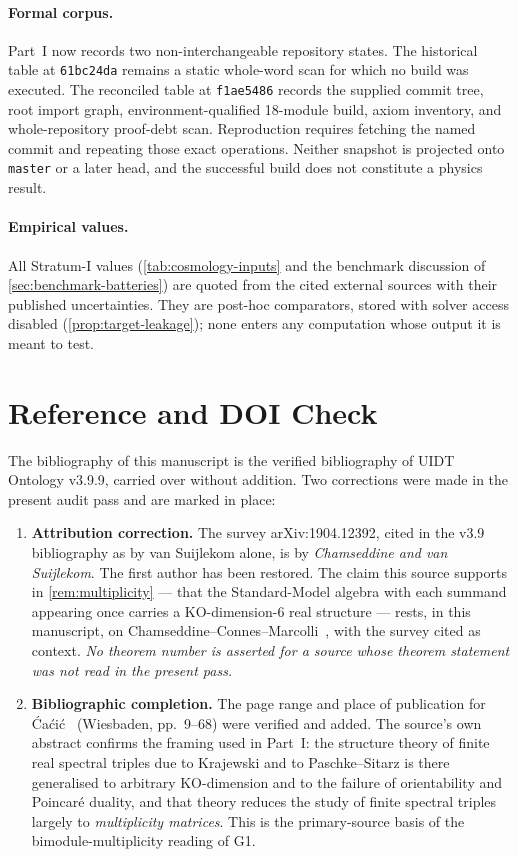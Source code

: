 \documentclass[12pt,a4paper,twoside]{article}
\theoremstyle{plain}
\theoremstyle{definition}
\theoremstyle{remark}
\begin{document}
\paragraph{Formal corpus.}
Part~I now records two non-interchangeable repository states. The historical
table at \texttt{61bc24da} remains a static whole-word scan for which no build
was executed. The reconciled table at \texttt{f1ae5486} records the supplied
commit tree, root import graph, environment-qualified 18-module build, axiom
inventory, and whole-repository proof-debt scan. Reproduction requires
fetching the named commit and repeating those exact operations. Neither
snapshot is projected onto \texttt{master} or a later head, and the successful
build does not constitute a physics result.

\paragraph{Empirical values.}
All Stratum-I values (\cref{tab:cosmology-inputs} and the benchmark
discussion of \cref{sec:benchmark-batteries}) are quoted from the cited
external sources with their published uncertainties. They are post-hoc
comparators, stored with solver access disabled
(\cref{prop:target-leakage}); none enters any computation whose output
it is meant to test.

\section{Reference and DOI Check}
\label{sec:doi-check}

\noindent The bibliography of this manuscript is the verified bibliography of
UIDT Ontology v3.9.9, carried over without addition. Two corrections
were made in the present audit pass and are marked in place:

\begin{enumerate}[leftmargin=1.6em,itemsep=0.25em]
\item \textbf{Attribution correction.} The survey arXiv:1904.12392,
cited in the v3.9 bibliography as by van Suijlekom alone, is by
\emph{Chamseddine and van Suijlekom}. The first author has been
restored. The claim this source supports in
\cref{rem:multiplicity} --- that the Standard-Model algebra with each
summand appearing once carries a KO-dimension-6 real structure ---
rests, in this manuscript, on Chamseddine--Connes--Marcolli~\cite{ccm2007},
with the survey cited as context. \emph{No theorem number is asserted
for a source whose theorem statement was not read in the present pass.}
\item \textbf{Bibliographic completion.} The page range and place of
publication for \'Ca\'ci\'c~\cite{cacic2011} (Wiesbaden, pp.~9--68) were
verified and added. The source's own abstract confirms the framing used
in Part~I: the structure theory of finite real spectral triples due to
Krajewski and to Paschke--Sitarz is there generalised to arbitrary
KO-dimension and to the failure of orientability and Poincar\'e duality,
and that theory reduces the study of finite spectral triples largely to
\emph{multiplicity matrices}. This is the primary-source basis of the
bimodule-multiplicity reading of G1.
\end{enumerate}
\end{document}
